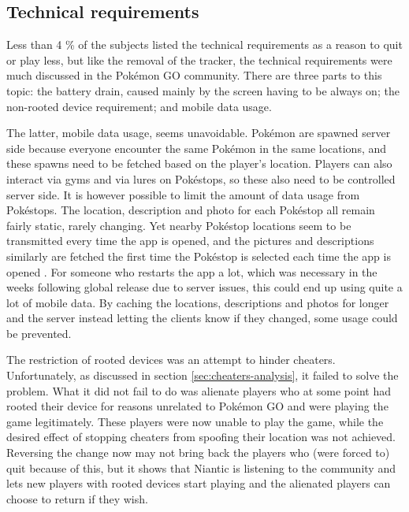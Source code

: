 \subsection{Technical requirements}
Less than 4 \% of the subjects listed the technical requirements as a reason to quit or play less, but like the removal of the tracker, the technical requirements were much discussed in the Pokémon GO community. There are three parts to this topic: the battery drain, caused mainly by the screen having to be always on; the non-rooted device requirement; and mobile data usage.

The latter, mobile data usage, seems unavoidable. Pokémon are spawned server side because everyone encounter the same Pokémon in the same locations, and these spawns need to be fetched based on the player's location. Players can also interact via gyms and via lures on Pokéstops, so these also need to be controlled server side. It is however possible to limit the amount of data usage from Pokéstops. The location, description and photo for each Pokéstop all remain fairly static, rarely changing. Yet nearby Pokéstop locations seem to be transmitted every time the app is opened, and the pictures and descriptions similarly are fetched the first time the Pokéstop is selected each time the app is opened . For someone who restarts the app a lot, which was necessary in the weeks following global release due to server issues, this could end up using quite a lot of mobile data. By caching the locations, descriptions and photos for longer and the server instead letting the clients know if they changed, some usage could be prevented.

The restriction of rooted devices  was an attempt to hinder cheaters. Unfortunately, as discussed in section \ref{sec:cheaters-analysis}, it failed to solve the problem. What it did not fail to do was alienate players who at some point had rooted their device for reasons unrelated to Pokémon GO and were playing the game legitimately. These players were now unable to play the game, while the desired effect of stopping cheaters from spoofing their location was not achieved. Reversing the change now may not bring back the players who (were forced to) quit because of this, but it shows that Niantic is listening to the community and lets new players with rooted devices start playing and the alienated players can choose to return if they wish.

